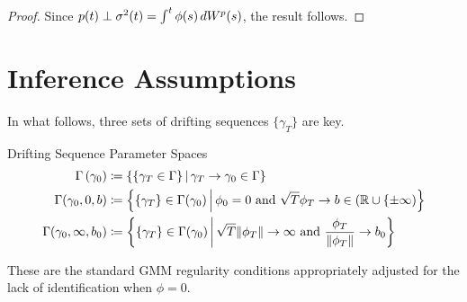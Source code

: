 \documentclass[11pt, letterpaper, twoside, final]{article}
\begin{document}
\begin{appendices}
\begin{proof}
    Since $p(t) \perp \sigma^2(t) = \int^t \phi(s) \mathop{}\!d W^{p}(s)$, the result follows.


\end{proof}

\section{Inference Assumptions}

    In what follows, three sets of drifting sequences $\lbrace \gamma_T \rbrace$ are key. 
    
    \begin{defn}{Drifting Sequence Parameter Spaces}
        \begin{align}
            \Gamma\left(\gamma_0\right) &\coloneqq \left\lbrace \left\lbrace \gamma_T \in \Gamma \right\rbrace
            \mvert \gamma_T \to \gamma_0 \in \Gamma \right\rbrace\\ 
            \Gamma(\gamma_0, 0, b) &\coloneqq \left\lbrace \lbrace \gamma_T \rbrace \in \Gamma(\gamma_0) \mvert
            \phi_0 = 0\ \text{and}\ \sqrt{T} \phi_T \to b \in (\R \cup \lbrace \pm \infty) \right\rbrace \\
            \Gamma(\gamma_0, \infty, b_0) &\coloneqq \left\lbrace \lbrace \gamma_T \rbrace \in \Gamma (\gamma_0)
            \mvert \sqrt{T} \norm{\phi_T} \to \infty\ \text{and}\ \frac{\phi_T}{\norm{\phi_T}} \to b_0
            \right\rbrace 
        \end{align}
    \end{defn}
    
    These are the standard GMM regularity conditions appropriately adjusted for the lack of identification when
    $\phi =0$.
    

\end{appendices}
\end{document}
